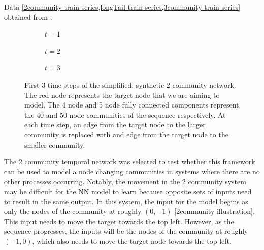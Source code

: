 \documentclass[12pt]{amsbook}
\begin{document}
\begin{chapter}{Data}
        \cref{2community train series,longTail train series,3community train series} obtained from \cite{Emma2023}.
        \begin{figure}[H]
            \centering
            \centering
            \begin{subfigure}[c]{0.3\textwidth}
                \centering
                \resizebox{.6\width}{!}{}
                \caption{$t=1$}
                \label{2community train series a}
            \end{subfigure}
            \hfill
            \centering
            \begin{subfigure}[c]{0.3\textwidth}
                \centering
                \resizebox{.6\width}{!}{}
                \caption{$t=2$}
                \label{2community train series b}
            \end{subfigure}
            \hfill
            \centering
            \begin{subfigure}[c]{0.3\textwidth}
                \centering
                \resizebox{.6\width}{!}{}
                \caption{$t=3$}
                \label{2community train series c}
            \end{subfigure}
            \caption{First 3 time steps of the simplified, synthetic 2 community network. The red node represents the target node that we are aiming to model. The 4 node and 5 node fully connected components represent the 40 and 50 node communities of the sequence respectively. At each time step, an edge from the target node to the larger community is replaced with and edge from the target node to the smaller community.}
            \label{2community train series}
        \end{figure}
        The 2 community temporal network was selected to test whether this framework can be used to model a node changing communities in systems where there are no other processes occurring. Notably, the movement in the 2 community system may be difficult for the NN model to learn because opposite sets of inputs need to result in the same output. In this system, the input for the model begins as only the nodes of the community at roughly $(0,-1)$ \cref{2community illustration}. This input needs to move the target towards the top left. However, as the sequence progresses, the inputs will be the nodes of the community at roughly $(-1,0)$, which also needs to move the target node towards the top left. 
 


\end{chapter}
\end{document}
